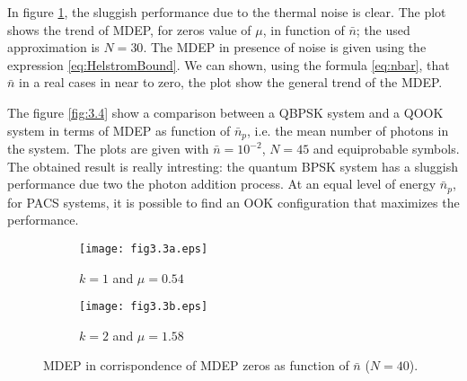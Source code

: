     In figure \ref{fig:3.3}, the sluggish performance due to the thermal noise is clear. The plot
    shows the trend of MDEP, for zeros value of $\mu$, in function of $\bar{n}$; the used approximation
    is $N=30$. The MDEP in presence of noise is given using the expression \ref{eq:HelstromBound}.
    We can shown, using the formula \ref{eq:nbar}, that $\bar{n}$ in a real cases in near to zero, the 
    plot show the general trend of the MDEP.
    
    The figure \ref{fig:3.4} show a comparison between a QBPSK system and a QOOK system in terms of 
    MDEP as function of $\bar{n}_p$, i.e. the mean number of photons in the system. 
    The plots are given with $\bar{n}= 10^{-2}$, $N=45$ and equiprobable symbols.
    The obtained result is really intresting: the quantum BPSK system has a sluggish performance due two 
    the photon addition process. At an equal level of energy $\bar{n}_p$, for PACS systems, it is
    possible to find an OOK configuration that maximizes the performance.
    \begin{figure}[t]
        \begin{subfigure}{0.5\textwidth}
            \texttt{[image: fig3.3a.eps]}
            \caption{$k=1$ and $\mu = 0.54$}
        \end{subfigure}
        \begin{subfigure}{0.5\textwidth}
            \texttt{[image: fig3.3b.eps]}
            \caption{$k=2$ and $\mu = 1.58$}
        \end{subfigure}
        \caption{MDEP in corrispondence of MDEP zeros as function of $\bar{n}$ ($N=40$).}
        \label{fig:3.3}
    \end{figure}
    